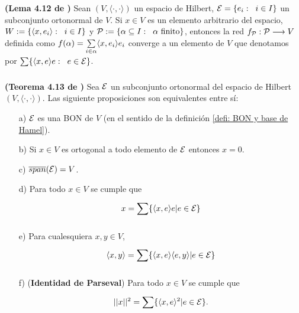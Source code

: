\begin{lema}
\label{lema: 4.12 conway}
\textbf{(Lema 4.12 de \cite{conway})}
Sean $(V, \langle \cdot , \cdot \rangle)$ un espacio
de Hilbert, $\mathcal{E}= \{e_{i}: \hspace{0.2cm} i \in I \}$ 
un subconjunto ortonormal de
$V$. Si $x \in V$ es un elemento arbitrario del espacio,
$W := \{ \langle x, e_{i} \rangle:\hspace{0.2cm} i \in I \}$
y $\mathcal{P}:= \{ \alpha \subseteq I: \hspace{0.2cm} \alpha \text{ finito} \}$,
entonces la red
$f_{\mathcal{P}}: \mathcal{P} \longrightarrow V$ 
definida como $f(\alpha) = \sum\limits_{i \in \alpha}^{}\langle x, e_{i} \rangle e_{i}$
converge a un elemento de $V$ que denotamos por 
$\sum\limits_{}^{} \{ \langle x, e \rangle e: \hspace{0.2cm} e \in \mathcal{E} \}$.
\end{lema}



\begin{teo} \label{thm: Coway, 4.13}
\textbf{(Teorema 4.13 de \cite{conway} )}
Sea $\mathcal{E}$ un subconjunto ortonormal del espacio
de Hilbert $(V, \langle \cdot , \cdot \rangle)$.
Las siguiente proposiciones son equivalentes entre sí:
\begin{itemize}
\item[a)] $\mathcal{E}$ es una BON de $V$ (en el sentido
de la definición \ref{defi: BON y base de Hamel}).
\item[b)] Si $x \in V$ es ortogonal a todo elemento de 
$\mathcal{E}$ entonces $x=0$.
\item[c)] $\overline{span}(\mathcal{E})= V$.
\item[d)] Para todo $x \in V$ se cumple que
\[
x = \sum\limits_{}^{}\{ \langle x,e \rangle e | e \in \mathcal{E} \}
\]
\item[e)] Para cualesquiera $x, y \in V$,
\[
\langle x,y \rangle= \sum\limits_{}^{}\{ \langle x,e \rangle  \langle e,y \rangle | e \in \mathcal{E} \}
\]
\item[f)](\textbf{Identidad de Parseval})
Para todo $x \in V$ se cumple que
\[
||x||^{2}= \sum\limits_{}^{}\{ \langle x,e \rangle ^{2} | e \in \mathcal{E} \}.
\]
\end{itemize}
\end{teo}

